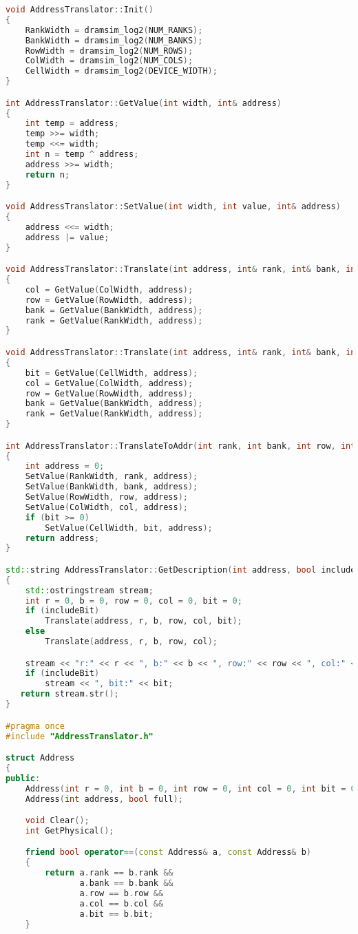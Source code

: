 \begin{lstlisting}[language=C++, style=cplusplusstyle]
void AddressTranslator::Init()
{
	RankWidth = dramsim_log2(NUM_RANKS);
	BankWidth = dramsim_log2(NUM_BANKS);
	RowWidth = dramsim_log2(NUM_ROWS);
	ColWidth = dramsim_log2(NUM_COLS);
	CellWidth = dramsim_log2(DEVICE_WIDTH);
}

int AddressTranslator::GetValue(int width, int& address)
{
    int temp = address;
    temp >>= width;
    temp <<= width;
    int n = temp ^ address;
    address >>= width;
    return n;
}

void AddressTranslator::SetValue(int width, int value, int& address)
{
	address <<= width;
	address |= value;	
}

void AddressTranslator::Translate(int address, int& rank, int& bank, int& row, int& col)
{
    col = GetValue(ColWidth, address);
    row = GetValue(RowWidth, address);
    bank = GetValue(BankWidth, address);
	rank = GetValue(RankWidth, address);
}

void AddressTranslator::Translate(int address, int& rank, int& bank, int& row, int& col, int& bit)
{
    bit = GetValue(CellWidth, address);
    col = GetValue(ColWidth, address);
    row = GetValue(RowWidth, address);
    bank = GetValue(BankWidth, address);
	rank = GetValue(RankWidth, address);
}

int AddressTranslator::TranslateToAddr(int rank, int bank, int row, int col, int bit)
{
	int address = 0;
	SetValue(RankWidth, rank, address);
	SetValue(BankWidth, bank, address);
	SetValue(RowWidth, row, address);
	SetValue(ColWidth, col, address);
	if (bit >= 0)
		SetValue(CellWidth, bit, address);
	return address;
}

std::string AddressTranslator::GetDescription(int address, bool includeBit)
{
    std::ostringstream stream;
    int r = 0, b = 0, row = 0, col = 0, bit = 0;
    if (includeBit)
        Translate(address, r, b, row, col, bit);
    else
        Translate(address, r, b, row, col);

    stream << "r:" << r << ", b:" << b << ", row:" << row << ", col:" << col;
    if (includeBit)
        stream << ", bit:" << bit;
   return stream.str();    
}

#pragma once
#include "AddressTranslator.h"

struct Address
{
public:
	Address(int r = 0, int b = 0, int row = 0, int col = 0, int bit = 0);
	Address(int address, bool full);

	void Clear();
	int GetPhysical();

	friend bool operator==(const Address& a, const Address& b)
	{
		return a.rank == b.rank &&
			   a.bank == b.bank &&
			   a.row == b.row &&
			   a.col == b.col &&
			   a.bit == b.bit;	
	}


\end{lstlisting}
